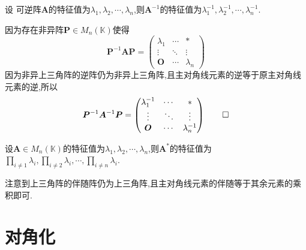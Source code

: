 \begin{formal}
\begin{proposition}[逆阵的特征值]\label{prop:逆阵的特征值}
    设 可逆阵$\bm{A}$的特征值为$\lambda_1,\lambda_2,\cdots,\lambda_n$,则$\bm{A}^{-1}$的特征值为$\lambda_1^{-1},\lambda_2^{-1},\cdots,\lambda_n^{-1}$.
\end{proposition}
\begin{Proof}
因为存在非异阵$\bm{P}\in M_n\left(
    \mathbb{K}
\right)$使得
\[
\bm{P}^{-1}\bm{AP}=\begin{pmatrix}
    \lambda_1&\cdots&*\\
    \vdots&\ddots&\vdots\\
    \bm{O}&\cdots&\lambda_n
\end{pmatrix}
\]因为非异上三角阵的逆阵仍为非异上三角阵,且主对角线元素的逆等于原主对角线元素的逆,所以
\[
\bm{P}^{-1}\bm{A}^{-1}\bm{P}=\begin{pmatrix}
    \lambda_1^{-1}&\cdots&*\\
    \vdots&\ddots&\vdots\\
    \bm{O}&\cdots&\lambda_n^{-1}
\end{pmatrix}\qedhere
\]
\end{Proof}
\end{formal}
\begin{formal}
\begin{proposition}[伴随阵的特征值]\label{prop:伴随阵的特征值}
    设$\bm{A}\in M_n\left(
        \mathbb{K}
    \right)$的特征值为$\lambda_1,\lambda_2,\cdots,\lambda_n$,则$\bm{A}^*$的特征值为
    $\displaystyle
    \prod_{i\neq 1}\lambda_i,\prod_{i\neq 2}\lambda_i,\cdots,\prod_{i\neq n}\lambda_i
    $.
\end{proposition}
\begin{Proof}
注意到上三角阵的伴随阵仍为上三角阵,且主对角线元素的伴随等于其余元素的乘积即可.
\end{Proof}
\end{formal}
\newpage
\section{对角化}
